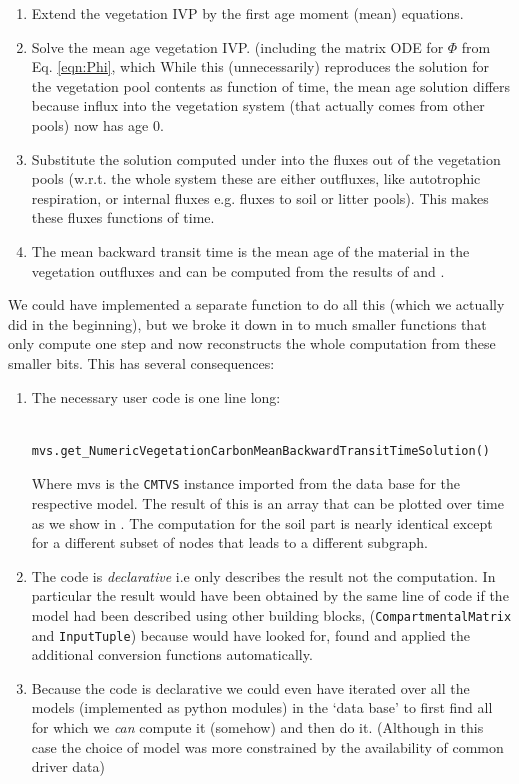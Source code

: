 \begin{enumerate}
  \item 
    Extend the vegetation IVP by the first age moment (mean) equations.
  \item 
    \label{enum:meanAgeVeg} Solve the mean age vegetation IVP. 
    (including the matrix ODE for $\Phi$ from Eq. \ref{eqn:Phi}, which
    While this (unnecessarily) reproduces the solution for the vegetation
    pool contents as function of time, the mean age solution differs because
    influx into the vegetation system (that actually comes from other pools) now
    has age 0.  \item \label{enum:numOutVeg} Substitute the solution computed under
     into the fluxes out of the vegetation pools (w.r.t.
    the whole system these are either outfluxes, like autotrophic respiration,
    or internal fluxes e.g. fluxes to soil or litter pools).  This makes
    these fluxes functions of time.  \item The mean backward transit time is
    the mean age of the material in the vegetation outfluxes and can be
    computed from the results of  and
    .  
\end{enumerate} 


We could have implemented a separate function to do all this (which we actually did in the beginning),
but we broke it down in to much smaller functions that only compute one step and now \ComputabilityGraphs{} 
reconstructs the whole computation from these smaller bits.  
This has several consequences:
\begin{enumerate}
  \item
    The necessary user code is one line long:\\
    \begin{verbatim}
      mvs.get_NumericVegetationCarbonMeanBackwardTransitTimeSolution() 
    \end{verbatim}
    Where mvs is the \texttt{CMTVS} instance imported from the data base for the
    respective model.  The result of this is an array that can be plotted over
    time as we show in . 
    The computation for the soil
    part is nearly identical except for a different subset of nodes that leads to a
    different subgraph.
  \item 
    The code is \emph{declarative} i.e only describes the result not the computation.
    In particular the result would have been obtained by the same line of code if the model had been described
    using other building blocks, (\texttt{CompartmentalMatrix} and \texttt{InputTuple})
    because \ComputabilityGraphs{} would have looked for, found and applied the additional 
    conversion functions automatically.
  \item
    Because the code is declarative we could even have iterated over all the models (implemented as python modules)
    in the `data base' to first find all for which we \emph{can} compute it (somehow) and then do it. 
    (Although in this case the choice of model was more constrained by the availability of common driver data)

\end{enumerate}


